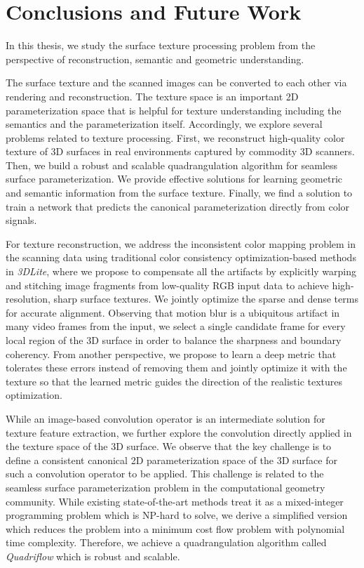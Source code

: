 \chapter{Conclusions and Future Work}
\label{chapter:conclude}
In this thesis, we study the surface texture processing problem from the perspective of reconstruction, semantic and geometric understanding.

The surface texture and the scanned images can be converted to each other via rendering and reconstruction. The texture space is an important 2D parameterization space that is helpful for texture understanding including the semantics and the parameterization itself. Accordingly, we explore several problems related to texture processing. First, we reconstruct high-quality color texture of 3D surfaces in real environments captured by commodity 3D scanners. Then, we build a robust and scalable quadrangulation algorithm for seamless surface parameterization. We provide effective solutions for learning geometric and semantic information from the surface texture. Finally, we find a solution to train a network that predicts the canonical parameterization directly from color signals.

For texture reconstruction, we address the inconsistent color mapping problem in the scanning data using traditional color consistency optimization-based methods in \emph{3DLite}, where we propose to compensate all the artifacts by explicitly warping and stitching image fragments from low-quality RGB input data to achieve high-resolution, sharp surface textures. We jointly optimize the sparse and dense terms for accurate alignment. Observing that motion blur is a ubiquitous artifact in many video frames from the input, we select a single candidate frame for every local region of the 3D surface in order to balance the sharpness and boundary coherency.
From another perspective, we propose to learn a deep metric that tolerates these errors instead of removing them and jointly optimize it with the texture so that the learned metric guides the direction of the realistic textures optimization.

While an image-based convolution operator is an intermediate solution for texture feature extraction, we further explore the convolution directly applied in the texture space of the 3D surface.
%
We observe that the key challenge is to define a consistent canonical 2D parameterization space of the 3D surface for such a convolution operator to be applied.
%
This challenge is related to the seamless surface parameterization problem in the computational geometry community. While existing state-of-the-art methods treat it as a mixed-integer programming problem which is NP-hard to solve, we derive a simplified version which reduces the problem into a minimum cost flow problem with polynomial time complexity. Therefore, we achieve a quadrangulation algorithm called \emph{Quadriflow} which is robust and scalable.

